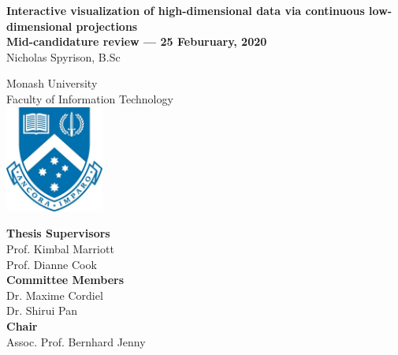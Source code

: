 \documentclass[
  11,
]{article}
\author{}
\date{\vspace{-2.5em}}
\begin{document}

\onehalfspacing
{}

\begin{center}
\huge{\textbf{Interactive visualization of high-dimensional data via
continuous low-dimensional projections}}\\
\vspace*{1\baselineskip}
\Large{\textbf{Mid-candidature review --- 25 Feburuary, 2020}}\\
\LARGE{Nicholas Spyrison, B.Sc}\\
\vspace*{1\baselineskip}

\LARGE{Monash University}\\
\Large{Faculty of Information Technology}\\
\vspace*{1\baselineskip}
\includegraphics[height = 3.5cm]{./figures/crest.jpg}\\
\vspace*{1\baselineskip}

\Large{\textbf{Thesis Supervisors}}\\
Prof. Kimbal Marriott\\
Prof. Dianne Cook\\
\vspace*{1\baselineskip}
\Large{\textbf{Committee Members}}\\
Dr. Maxime Cordiel\\
Dr. Shirui Pan\\
\vspace*{1\baselineskip}
\Large{\textbf{Chair}}\\
Assoc. Prof. Bernhard Jenny\\
\end{center}

\doublespacing

\newpage
{}
\end{document}
